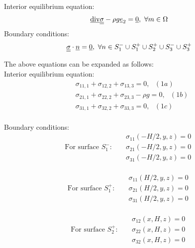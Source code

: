 \documentclass[letter,12pt]{article}
\begin{document}
Interior equilibrium equation: 
\begin{equation}
\underline{\text{div}} \underline{\underline{\sigma}} -\rho g \underline{e}_{2} = \underline{0}, \text{ }\forall m \in \Omega
\end{equation}
Boundary conditions: 
\begin{equation}
\underline{\underline{\sigma}} \cdot \underline{n} = \underline{0}, \text{ } \forall n \in S_{1}^{-} \cup S_{1}^{+} \cup S_{2}^{+} \cup S_{3}^{-} \cup S_{3}^{+}
\end{equation}

The above equations can be expanded as follows: \\

Interior equilibrium equation:
\begin{equation}
\begin{aligned}
& \sigma_{11,1}+\sigma_{12,2}+\sigma_{13,3}=0, \text{ }(1a) \\
& \sigma_{21,1}+\sigma_{22,2}+\sigma_{23,3}-\rho g=0, \text{ }(1b) \\
& \sigma_{31,1}+\sigma_{32,2}+\sigma_{33,3}=0, \text{ }(1c)
\end{aligned}
\end{equation}\\

Boundary conditions: 
\begin{equation}
\text{For surface } S_{1}^{-}: \text{	}
\begin{aligned}
&\sigma_{11}(-H/2,y,z)=0\\
&\sigma_{21}(-H/2,y,z)=0\\
&\sigma_{31}(-H/2,y,z)=0
\end{aligned}
\end{equation} \\

\begin{equation}
\text{For surface } S_{1}^{+}: \text{	}
\begin{aligned}
&\sigma_{11}(H/2,y,z)=0\\
&\sigma_{21}(H/2,y,z)=0\\
&\sigma_{31}(H/2,y,z)=0
\end{aligned}
\end{equation} \\

\begin{equation}
\text{For surface } S_{2}^{+}: \text{	}
\begin{aligned}
&\sigma_{12}(x,H,z)=0\\
&\sigma_{22}(x,H,z)=0\\
&\sigma_{32}(x,H,z)=0
\end{aligned}
\end{equation} \\
\end{document}
